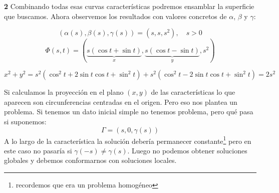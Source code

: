 \begin{example}{\bf 2}
		Combinando todas esas curvas características podremos ensamblar la superficie que buscamos. Ahora observemos los resultados con valores concretos de $\alpha$, $\beta$ y $\gamma$:

		$$(\alpha(s), \beta(s), \gamma(s)) = (s,s,s^2), \quad s>0$$
		$$\Phi(s,t) = (\underbrace{s(\cos t + \sin t)}_{x}, \underbrace{s(\cos t - \sin t)}_{y},s^2)$$

		$$x^2 + y^2 = s^2 (\cos^2 t + 2 \sin t \cos t + \sin^2 t) + s^2 (\cos^2 t - 2 \sin t \cos t + \sin^2 t) = 2s^2$$

		Si calculamos la proyección en el plano $(x,y)$ de las características lo que aparecen son circunferencias centradas en el origen. Pero eso nos plantea un problema. Si tenemos un dato inicial simple no tenemos problema, pero qué pasa si suponemos:
		$$\Gamma = (s, 0, \gamma(s))$$
		A lo largo de la característica la solución debería permanecer constante\footnote{recordemos que era un problema homogéneo
		} pero en este caso no pasaría si $\gamma(-s) \neq \gamma(s)$. Luego no podemos obtener soluciones globales y debemos conformarnos con soluciones locales.


	\end{example}

